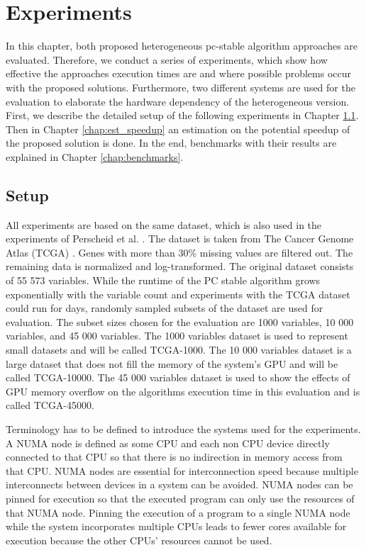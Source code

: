 \chapter{Experiments}
\label{chap:experiments}
In this chapter, both proposed heterogeneous pc-stable algorithm approaches are evaluated. Therefore, we conduct a series of experiments, which show how effective the approaches execution times are and where possible problems occur with the proposed solutions. Furthermore, two different systems are used for the evaluation to elaborate the hardware dependency of the heterogeneous version. First, we describe the detailed setup of the following experiments in Chapter \ref{chap:setup}. Then in Chapter \ref{chap:est_speedup} an estimation on the potential speedup of the proposed solution is done. In the end, benchmarks with their results are explained in Chapter \ref{chap:benchmarks}.

\section{Setup}
\label{chap:setup}
All experiments are based on the same dataset, which is also used in the experiments of Perscheid et al. \cite{perscheidIntegrativeGeneSelection2018}. The dataset is taken from The Cancer Genome Atlas (TCGA) \cite{weinsteinCancerGenomeAtlas2013}. Genes with more than 30\% missing values are filtered out. The remaining data is normalized and log-transformed. The original dataset consists of 55 573 variables. While the runtime of the PC stable algorithm grows exponentially with the variable count and experiments with the TCGA dataset could run for days, randomly sampled subsets of the dataset are used for evaluation. The subset sizes chosen for the evaluation are 1000 variables, 10 000 variables, and 45 000 variables. The 1000 variables dataset is used to represent small datasets and will be called TCGA-1000. The 10 000 variables dataset is a large dataset that does not fill the memory of the system's GPU and will be called TCGA-10000. The 45 000 variables dataset is used to show the effects of GPU memory overflow on the algorithms execution time in this evaluation and is called TCGA-45000.

Terminology has to be defined to introduce the systems used for the experiments. A NUMA node is defined as some CPU and each non CPU device directly connected to that CPU so that there is no indirection in memory access from that CPU. NUMA nodes are essential for interconnection speed because multiple interconnects between devices in a system can be avoided. NUMA nodes can be pinned for execution so that the executed program can only use the resources of that NUMA node. Pinning the execution of a program to a single NUMA node while the system incorporates multiple CPUs leads to fewer cores available for execution because the other CPUs' resources cannot be used.

